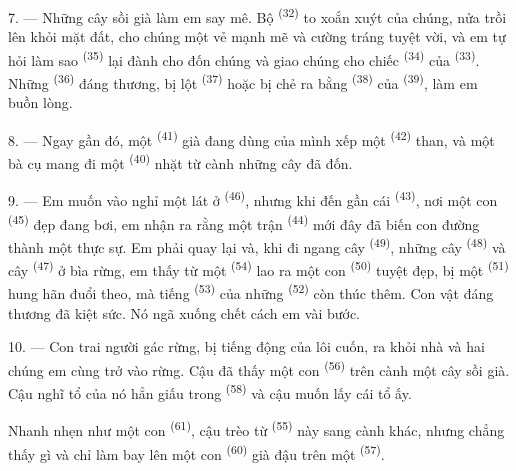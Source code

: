 7. --- Những cây sồi già làm em say mê. Bộ  \textsuperscript{(32)} to xoắn
xuýt của chúng, nửa trồi lên khỏi mặt đất, cho chúng một vẻ mạnh mẽ và cường tráng tuyệt
vời, và em tự hỏi làm sao  \textsuperscript{(35)} lại đành cho đốn
chúng và giao chúng cho chiếc  \textsuperscript{(34)} của  \textsuperscript{(33)}. Những  \textsuperscript{(36)} đáng thương,
bị lột  \textsuperscript{(37)} hoặc bị chẻ ra bằng 
\textsuperscript{(38)} của  \textsuperscript{(39)}, làm em
buồn lòng.

8. --- Ngay gần đó, một  \textsuperscript{(41)} già đang dùng
 của mình xếp một  \textsuperscript{(42)} than, và một bà cụ
mang đi một  \textsuperscript{(40)}  nhặt từ cành những cây
đã đốn.

\VUsaut{3.0mm}
\VUsaut{3.0mm}

9. --- Em muốn vào nghỉ một lát ở  \textsuperscript{(46)},
nhưng khi đến gần cái  \textsuperscript{(43)}, nơi một con 
\textsuperscript{(45)} đẹp đang bơi, em nhận ra rằng một trận 
\textsuperscript{(44)} mới đây đã biến con đường thành một  thực sự. Em
phải quay lại và, khi đi ngang cây  \textsuperscript{(49)}, những cây
 \textsuperscript{(48)} và cây  \textsuperscript{(47)} ở bìa
rừng, em thấy từ một  \textsuperscript{(54)} lao ra một con 
\textsuperscript{(50)} tuyệt đẹp, bị một  \textsuperscript{(51)} hung
hãn đuổi theo, mà tiếng  \textsuperscript{(53)} của những  \textsuperscript{(52)} còn thúc thêm. Con vật đáng thương đã kiệt sức. Nó ngã
xuống chết cách em vài bước.

10. --- Con trai người gác rừng, bị tiếng động của  lôi cuốn, ra
khỏi nhà và hai chúng em cùng trở vào rừng. Cậu đã thấy một con 
\textsuperscript{(56)} trên cành một cây sồi già. Cậu nghĩ tổ của nó hẳn giấu trong
 \textsuperscript{(58)} và cậu muốn lấy cái tổ ấy.

Nhanh nhẹn như một con  \textsuperscript{(61)}, cậu trèo từ 
\textsuperscript{(55)} này sang cành khác, nhưng chẳng thấy gì và chỉ làm bay lên một
con  \textsuperscript{(60)} già đậu trên một 
\textsuperscript{(57)}.
\VUsaut{4.0mm}
\VUfilet{22mm}
